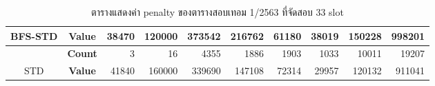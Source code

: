 \begin{table}[]
{\begin{tabular}{@{}ccrrrrrrrr@{}}
    \multirow{-2}{*}{BFS-STD}                    & \textbf{Value}                        & 38470                          & 120000                         & 373542                         & 216762                         & 61180                          & 38019                          & 150228                         & 998201                           \\ \midrule
                                                  & {\textbf{Count}} & {3}       & {16}      & {4355}    & {1886}    & {1903}    & {1033}    & {10011}   & {19207}     \\ \cmidrule(l){2-10} 
    \multirow{-2}{*}{STD} & {\textbf{Value}} & {41840}   & {160000}  & {339690}  & {147108}  & {72314}   & {29957}   & {120132}  & {911041}    \\ \bottomrule
    \end{tabular}%
    }
    \caption{ตารางแสดงค่า penalty ของตารางสอบเทอม 1/2563 ที่จัดสอบ 33 slot}
    \label{tab:result_table_163_33}
\end{table}
